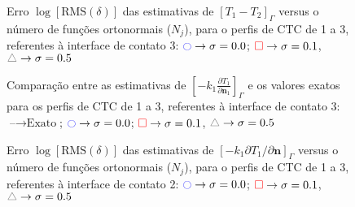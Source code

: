 \begin{figure}[h!b]
	\caption{Erro $\log[\text{RMS}(\delta)]$ das estimativas de $[T_1 - T_2]_\Gamma$ versus o número de funções ortonormais ($N_j$), para o perfis de CTC de 1 a 3, referentes à interface de contato 3: $\textcolor{blue}{\ocircle} \rightarrow \sigma = 0.0$; $\textcolor{red}{\square} \rightarrow \sigma = 0.1$, $\textcolor{gray}{\triangle} \rightarrow \sigma = 0.5$}
\end{figure}

\begin{figure}[h!b]
	\caption{Comparação entre as estimativas de $\left[-k_1 \frac{\partial T_1}{\partial\mathbf{n}_1}\right]_\Gamma$ e os valores exatos para os perfis de CTC de 1 a 3, referentes à interface de contato 3: $\text{--} \rightarrow \text{Exato}$; $\textcolor{blue}{\ocircle} \rightarrow \sigma = 0.0$; $\textcolor{red}{\square} \rightarrow \sigma = 0.1$, $\textcolor{gray}{\triangle} \rightarrow \sigma = 0.5$}
\end{figure}

\begin{figure}[h!b]
	\caption{Erro $\log[\text{RMS}(\delta)]$ das estimativas de $[-k_1 \partial T_1/\partial\mathbf{n}]_\Gamma$ versus o número de funções ortonormais ($N_j$), para o perfis de CTC de 1 a 3, referentes à interface de contato 2: $\textcolor{blue}{\ocircle} \rightarrow \sigma = 0.0$; $\textcolor{red}{\square} \rightarrow \sigma = 0.1$, $\textcolor{gray}{\triangle} \rightarrow \sigma = 0.5$}
\end{figure}

\begin{figure}[h!b]
\end{figure}

